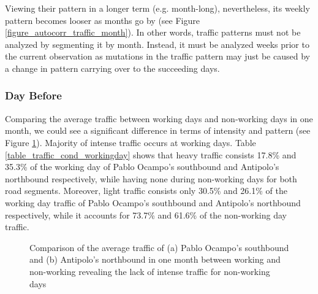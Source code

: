 Viewing their pattern in a longer term (e.g. month-long), nevertheless, its weekly pattern becomes looser as months go by (see Figure \ref{figure_autocorr_traffic_month}). In other words, traffic patterns must not be analyzed by segmenting it by month. Instead, it must be analyzed weeks prior to the current observation as mutations in the traffic pattern may just be caused by a change in pattern carrying over to the succeeding days.


 
\subsubsection{Day Before}

Comparing the average traffic between working days and non-working days in one month, we could see a significant difference in terms of intensity and pattern (see Figure \ref{figure_workingday_comparison}). Majority of intense traffic occurs at working days. Table \ref{table_traffic_cond_workingday} shows that heavy traffic consists 17.8\% and 35.3\% of the working day of Pablo Ocampo’s southbound and Antipolo’s northbound respectively, while having none during non-working days for both road segments. Moreover, light traffic consists only 30.5\% and 26.1\% of the working day traffic of Pablo Ocampo’s southbound and Antipolo’s northbound respectively, while it accounts for 73.7\% and 61.6\% of the non-working day traffic.


\begin{figure}[!t] 
\centering
    \centering
      \captionsetup{justification=centering}
    \hfill
    \caption{Comparison of the average traffic of (a) Pablo Ocampo’s southbound and (b) Antipolo’s northbound  in one month between working and non-working revealing the lack of intense traffic for non-working days}

    \label{figure_workingday_comparison}
\end{figure}



